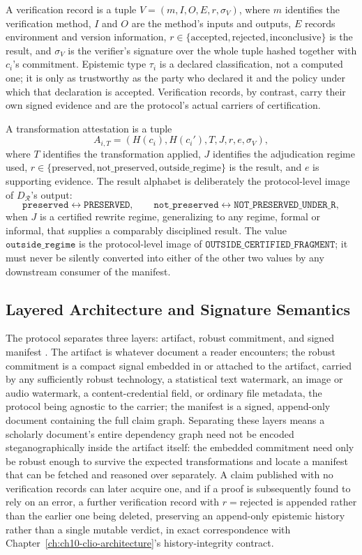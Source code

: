 A verification record is a tuple $V = (m, I, O, E, r, \sigma_V)$, where $m$ identifies the verification method, $I$ and $O$ are the method's inputs and outputs, $E$ records environment and version information, $r \in \{\mathrm{accepted}, \mathrm{rejected}, \mathrm{inconclusive}\}$ is the result, and $\sigma_V$ is the verifier's signature over the whole tuple hashed together with $c_i$'s commitment. Epistemic type $\tau_i$ is a declared classification, not a computed one; it is only as trustworthy as the party who declared it and the policy under which that declaration is accepted. Verification records, by contrast, carry their own signed evidence and are the protocol's actual carriers of certification.

A transformation attestation is a tuple
\[
A_{i,T} = (H(c_i), H(c_i'), T, J, r, e, \sigma_V),
\]
where $T$ identifies the transformation applied, $J$ identifies the adjudication regime used, $r \in \{\mathrm{preserved}, \mathrm{not\_preserved}, \mathrm{outside\_regime}\}$ is the result, and $e$ is supporting evidence. The result alphabet is deliberately the protocol-level image of $D_{\mathcal{R}}$'s output:
\[
\mathtt{preserved} \leftrightarrow \mathtt{PRESERVED}, \qquad \mathtt{not\_preserved} \leftrightarrow \mathtt{NOT\_PRESERVED\_UNDER\_R},
\]
when $J$ is a certified rewrite regime, generalizing to any regime, formal or informal, that supplies a comparably disciplined result. The value $\mathtt{outside\_regime}$ is the protocol-level image of $\mathtt{OUTSIDE\_CERTIFIED\_FRAGMENT}$; it must never be silently converted into either of the other two values by any downstream consumer of the manifest.

\subsection{Layered Architecture and Signature Semantics}

The protocol separates three layers: artifact, robust commitment, and signed manifest \cite{groth2010,w3c_vc}. The artifact is whatever document a reader encounters; the robust commitment is a compact signal embedded in or attached to the artifact, carried by any sufficiently robust technology, a statistical text watermark, an image or audio watermark, a content-credential field, or ordinary file metadata, the protocol being agnostic to the carrier; the manifest is a signed, append-only document containing the full claim graph. Separating these layers means a scholarly document's entire dependency graph need not be encoded steganographically inside the artifact itself: the embedded commitment need only be robust enough to survive the expected transformations and locate a manifest that can be fetched and reasoned over separately. A claim published with no verification records can later acquire one, and if a proof is subsequently found to rely on an error, a further verification record with $r = \mathrm{rejected}$ is appended rather than the earlier one being deleted, preserving an append-only epistemic history rather than a single mutable verdict, in exact correspondence with Chapter~\ref{ch:ch10-clio-architecture}'s history-integrity contract.

